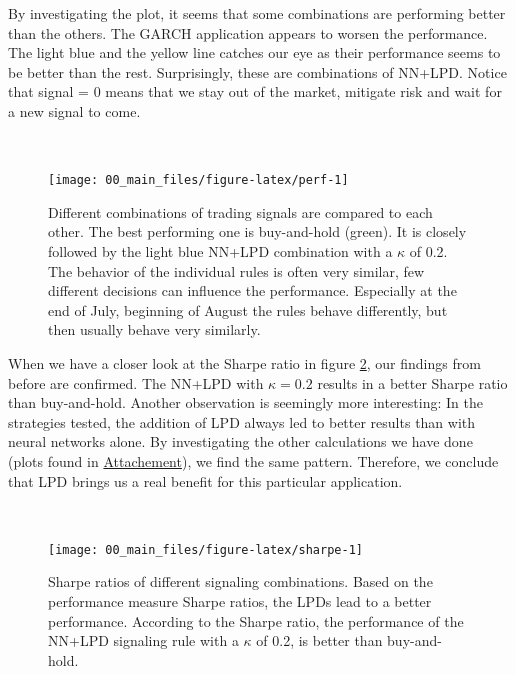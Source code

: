 \documentclass[
]{article}
\begin{document}
By investigating the plot, it seems that some combinations are
performing better than the others. The GARCH application appears to
worsen the performance. The light blue and the yellow line catches our
eye as their performance seems to be better than the rest. Surprisingly,
these are combinations of NN+LPD. Notice that signal = 0 means that we
stay out of the market, mitigate risk and wait for a new signal to come.

~

\begin{figure}

{\centering \texttt{[image: 00\_main\_files/figure-latex/perf-1]} 

}

\caption{Different combinations of trading signals are compared to each other. The best performing one is buy-and-hold (green). It is closely followed by the light blue NN+LPD combination with a $\kappa$ of 0.2. The behavior of the individual rules is often very similar, few different decisions can influence the performance. Especially at the end of July, beginning of August the rules behave differently, but then usually behave very similarly.}\label{fig:perf}
\end{figure}

\newpage

When we have a closer look at the Sharpe ratio in figure
\ref{fig:sharpe}, our findings from before are confirmed. The NN+LPD
with \(\kappa = 0.2\) results in a better Sharpe ratio than
buy-and-hold. Another observation is seemingly more interesting: In the
strategies tested, the addition of LPD always led to better results than
with neural networks alone. By investigating the other calculations we
have done (plots found in \protect\hyperlink{attachement}{Attachement}),
we find the same pattern. Therefore, we conclude that LPD brings us a
real benefit for this particular application.

~

\begin{figure}

{\centering \texttt{[image: 00\_main\_files/figure-latex/sharpe-1]} 

}

\caption{Sharpe ratios of different signaling combinations. Based on the performance measure Sharpe ratios, the LPDs lead to a better performance. According to the Sharpe ratio, the performance of the NN+LPD signaling rule with a $\kappa$ of 0.2, is better than buy-and-hold.}\label{fig:sharpe}
\end{figure}
\end{document}

